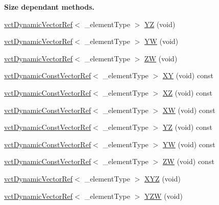 \begin{Indent}{\bf Size dependant methods.}
\begin{DoxyCompactItemize}
\hyperlink{classvct_dynamic_vector_ref}{vct\+Dynamic\+Vector\+Ref}$<$ \+\_\+element\+Type $>$ \hyperlink{classvct_dynamic_vector_base_a42ae7ee6df6d93a1248338490e5d2440}{Y\+Z} (void)
\item 
\hyperlink{classvct_dynamic_vector_ref}{vct\+Dynamic\+Vector\+Ref}$<$ \+\_\+element\+Type $>$ \hyperlink{classvct_dynamic_vector_base_a354e6752fbb9ae3d559f868a47df9ae1}{Y\+W} (void)
\item 
\hyperlink{classvct_dynamic_vector_ref}{vct\+Dynamic\+Vector\+Ref}$<$ \+\_\+element\+Type $>$ \hyperlink{classvct_dynamic_vector_base_a79547eec078c029c39968a24be5ff789}{Z\+W} (void)
\item 
\hyperlink{classvct_dynamic_const_vector_ref}{vct\+Dynamic\+Const\+Vector\+Ref}$<$ \+\_\+element\+Type $>$ \hyperlink{classvct_dynamic_vector_base_afe423ba4dc5c4a4c1862cecd40d976ea}{X\+Y} (void) const 
\item 
\hyperlink{classvct_dynamic_const_vector_ref}{vct\+Dynamic\+Const\+Vector\+Ref}$<$ \+\_\+element\+Type $>$ \hyperlink{classvct_dynamic_vector_base_aa9c7bbdbec9e45e55d9e2a40851a69a6}{X\+Z} (void) const 
\item 
\hyperlink{classvct_dynamic_const_vector_ref}{vct\+Dynamic\+Const\+Vector\+Ref}$<$ \+\_\+element\+Type $>$ \hyperlink{classvct_dynamic_vector_base_a519032c001cf5abef98eec4a8d507547}{X\+W} (void) const 
\item 
\hyperlink{classvct_dynamic_const_vector_ref}{vct\+Dynamic\+Const\+Vector\+Ref}$<$ \+\_\+element\+Type $>$ \hyperlink{classvct_dynamic_vector_base_adb644a21e8df88cbcc256131f7381481}{Y\+Z} (void) const 
\item 
\hyperlink{classvct_dynamic_const_vector_ref}{vct\+Dynamic\+Const\+Vector\+Ref}$<$ \+\_\+element\+Type $>$ \hyperlink{classvct_dynamic_vector_base_a0831c0124fb285f0f357bd234e1012c4}{Y\+W} (void) const 
\item 
\hyperlink{classvct_dynamic_const_vector_ref}{vct\+Dynamic\+Const\+Vector\+Ref}$<$ \+\_\+element\+Type $>$ \hyperlink{classvct_dynamic_vector_base_a6c17bdbbc81a83c91e482e1449eb351b}{Z\+W} (void) const 
\item 
\hyperlink{classvct_dynamic_vector_ref}{vct\+Dynamic\+Vector\+Ref}$<$ \+\_\+element\+Type $>$ \hyperlink{classvct_dynamic_vector_base_a41e0d558b7e790345d4e5638292dbc31}{X\+Y\+Z} (void)
\item 
\hyperlink{classvct_dynamic_vector_ref}{vct\+Dynamic\+Vector\+Ref}$<$ \+\_\+element\+Type $>$ \hyperlink{classvct_dynamic_vector_base_ad7aafd0663f3a997715ecaa20927192b}{Y\+Z\+W} (void)
\item 

\end{DoxyCompactItemize}
\end{Indent}
